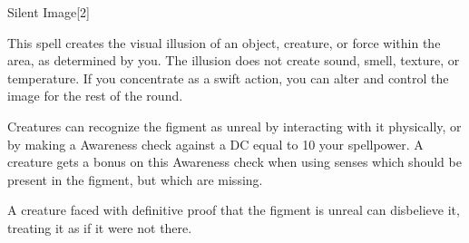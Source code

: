 \begin{spellsection}{Silent Image}[2]
    \begin{spellheader}
    \end{spellheader}
    \begin{spellcontent}
        \begin{spelltargetinginfo}
        \end{spelltargetinginfo}
        \begin{spelleffects}
            \spelleffect This spell creates the visual illusion of an object, creature, or force within the area, as determined by you. The illusion does not create sound, smell, texture, or temperature. If you concentrate as a swift action, you can alter and control the image for the rest of the round.
            \spelldur \durshort
        \end{spelleffects}
    \end{spellcontent}
    \begin{spellfooter}
        \spellnotes Creatures can recognize the figment as unreal by interacting with it physically, or by making a Awareness check against a DC equal to 10 \add your spellpower. A creature gets a  bonus on this Awareness check when using senses which should be present in the figment, but which are missing.

        A creature faced with definitive proof that the figment is unreal can disbelieve it, treating it as if it were not there.
        \miscastexplode
    \end{spellfooter}
\end{spellsection}

